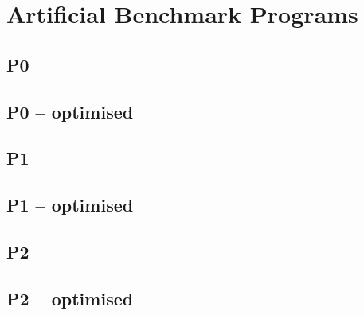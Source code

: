 \chapter{Artificial Benchmark Programs}
\label{app:artificial-benchmark-programs}

\section{P0}



\section{P0 -- optimised}



\section{P1}



\section{P1 -- optimised}



\section{P2}



\section{P2 -- optimised}



